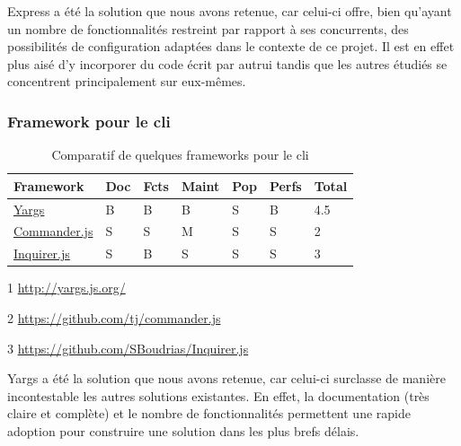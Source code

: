 Express a été la solution que nous avons retenue, car celui-ci offre, bien qu'ayant un nombre de fonctionnalités restreint par rapport à ses concurrents, des possibilités de configuration  adaptées dans le contexte de ce projet. Il est en effet plus aisé d'y incorporer du code écrit par autrui tandis que les autres étudiés se concentrent principalement sur eux-mêmes. 

\subsubsection*{Framework pour le \Gls{cli}}

\begin{table}[H]
    \centering
    \begin{threeparttable}
    \begin{tabular}{| l | l | l | l | l | l | l |}
    \hline
        Framework & Doc & Fcts & Maint & Pop & Perfs & Total \\
    \hline
        \href{http://yargs.js.org/}{Yargs}\tnote{1} &
        B &  
        B &
        B &            
        S &              
        B &   
        4.5 \\
    \hline
        \href{https://github.com/tj/commander.js}{Commander.js}\tnote{2} &
        S &                
        S &   
        M &
        S &              
        S &  
        2 \\
    \hline
        \href{https://github.com/SBoudrias/Inquirer.js}{Inquirer.js}\tnote{3} &
        S &                
        B &     
        S &
        S &              
        S &      
        3 \\  
    \hline
    \end{tabular}
        \begin{tablenotes}
        \item[1] \url{http://yargs.js.org/}
        \item[2] \url{https://github.com/tj/commander.js}
        \item[3] \url{https://github.com/SBoudrias/Inquirer.js}
    \end{tablenotes}
    \end{threeparttable}
    \caption{Comparatif de quelques frameworks pour le \Gls{cli}}
    \label{table:compFrameworksCLI}
\end{table}

Yargs a été la solution que nous avons retenue, car celui-ci surclasse de manière incontestable les autres solutions existantes. En effet, la documentation (très claire et complète) et le nombre de fonctionnalités permettent une rapide adoption pour construire une solution dans les plus brefs délais. 

